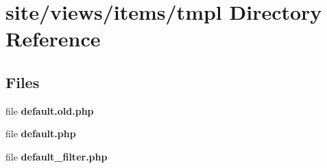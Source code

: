 \section{site/views/items/tmpl Directory Reference}
\label{dir_a090f5ec16190e4831b994208471725f}
\subsection*{Files}
\begin{DoxyCompactItemize}
\item 
file \textbf{ default.\+old.\+php}
\item 
file \textbf{ default.\+php}
\item 
file \textbf{ default\+\_\+filter.\+php}
\end{DoxyCompactItemize}
